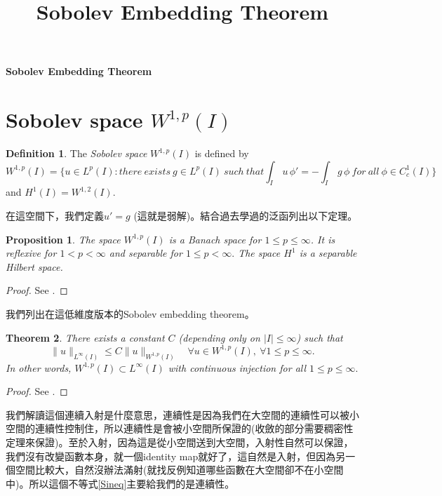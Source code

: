 \documentclass[11pt]{article}
\newtheorem{theorem}{Theorem}
\newtheorem{proposition}[theorem]{Proposition}
\theoremstyle{definition}
\newtheorem*{definition}{Definition}
\theoremstyle{remark}
\numberwithin{equation}{section}
\numberwithin{theorem}{section}
\begin{document}
\setcounter{section}{0}
\title{Sobolev Embedding Theorem}

\thispagestyle{empty}
\begin{center}
{\LARGE \bf Sobolev Embedding Theorem}
\end{center}
\section{Sobolev space $W^{1,p}(I)$}
\begin{definition} The \emph{Sobolev space} $W^{1,p}(I)$ is defined by
\begin{equation}\label{Sineq}
W^{1,p}(I)=\{u\in L^p(I): there\ exists\ g\in L^p(I)\ such\ that \int_I\,u\,\phi'=-\int_I\,g\,\phi\ for\ all\ \phi\in C^1_c(I)\}
\end{equation}
and $H^1(I)=W^{1,2}(I)$. 
\end{definition}
在這空間下，我們定義$u'=g$ (這就是弱解)。結合過去學過的泛函列出以下定理。

\begin{proposition} The space $W^{1,p}(I)$ is a Banach space for $1\leq p\leq\infty$. It is reflexive for $1<p<\infty$ and separable for $1\leq p<\infty.$ The space $H^1$ is a separable Hilbert space.
\end{proposition}
\begin{proof} 
See \cite[p.~203]{Bre10}.
\end{proof}
我們列出在這低維度版本的Sobolev embedding theorem。

\begin{theorem}\label{Sobolevembedding} There exists a constant $C$ (depending only on $\lvert I\rvert\leq\infty$) such that 
$$
\lVert u\rVert_{L^\infty(I)}\leq C\lVert u\rVert_{W^{1,p}(I)}\quad\forall u\in W^{1,p}(I),\ \forall 1\leq p\leq\infty.
$$
In other words, $W^{1,p}(I)\subset L^\infty(I)$ with continuous injection for all $1\leq p\leq\infty.$ 
\end{theorem}
\begin{proof} 
See \cite[p.~213]{Bre10}.
\end{proof}
我們解讀這個連續入射是什麼意思，連續性是因為我們在大空間的連續性可以被小空間的連續性控制住，所以連續性是會被小空間所保證的(收斂的部分需要稠密性定理來保證)。至於入射，因為這是從小空間送到大空間，入射性自然可以保證，我們沒有改變函數本身，就一個identity map就好了，這自然是入射，但因為另一個空間比較大，自然沒辦法滿射(就找反例知道哪些函數在大空間卻不在小空間中)。所以這個不等式\eqref{Sineq}主要給我們的是連續性。
\end{document}
